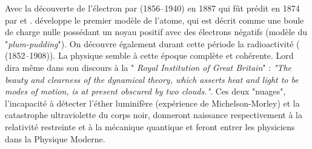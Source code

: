 Avec la découverte de l'électron par  (\num{1856}--\num{1940}) en \num{1887} qui fût prédit en \num{1874} par  et .  développe le premier modèle de l'atome, qui est décrit comme une boule de charge nulle possédant un noyau positif avec des électrons négatifs (modèle du "\textit{plum-pudding}"). On découvre également durant cette période la radioactivité ( (\num{1852}--\num{1908})). La physique semble à cette époque complète et cohérente. Lord  dira même dans son discours à la " \textit{Royal Institution of Great Britain}" : \textit{"The beauty and clearness of the dynamical theory, which asserts heat and light to be modes of motion, is at present obscured by two clouds."}. Ces deux "nuages", l'incapacité à détecter l'éther luminifère  (expérience de Michelson-Morley) et la catastrophe ultraviolette du corps noir, donneront naissance respectivement à la relativité restreinte et à la mécanique quantique et feront entrer les physiciens dans la Physique Moderne.

